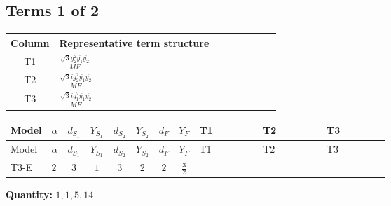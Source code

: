 \documentclass[8pt]{article}
\begin{document}
\begin{landscape}
\subsection*{Terms 1 of 2}
\begin{center}
\begin{tabular}{@{}c >{\raggedright\arraybackslash}p{0.82\linewidth}@{}}
\toprule
Column & Representative term structure \\
\midrule
T1 & \(\displaystyle \frac{\sqrt{3} g_{2}^{2} \overline{y_{1}} \overline{y_{2}}}{MF}\) \\
\midrule
T2 & \(\displaystyle \frac{\sqrt{3} i g_{2}^{2} \overline{y_{1}} \overline{y_{2}}}{MF}\) \\
\midrule
T3 & \(\displaystyle \frac{\sqrt{3} i g_{1}^{2} \overline{y_{1}} \overline{y_{2}}}{MF}\) \\
\midrule
\bottomrule
\end{tabular}
\end{center}
\smallskip
\tiny
\begin{longtable}{@{}llcccccc >{\raggedright\arraybackslash}p{0.21\linewidth} >{\raggedright\arraybackslash}p{0.21\linewidth} >{\raggedright\arraybackslash}p{0.21\linewidth}@{}}
\toprule
Model & $\alpha$ & $d_{S_1}$ & $Y_{S_1}$ & $d_{S_2}$ & $Y_{S_2}$ & $d_F$ & $Y_F$ & T1 & T2 & T3 \\
\midrule
\endfirsthead
\toprule
Model & $\alpha$ & $d_{S_1}$ & $Y_{S_1}$ & $d_{S_2}$ & $Y_{S_2}$ & $d_F$ & $Y_F$ & T1 & T2 & T3 \\
\midrule
\endhead
T3-E & $2$ & $3$ & $1$ & $3$ & $2$ & $2$ & $\frac{3}{2}$ & \scriptsize\adjustbox{max width=\linewidth}{$\begin{gathered} \frac{\sqrt{3} g_{2}^{2} \overline{y_{1}} \overline{y_{2}}}{6 MF}\end{gathered}$} & \scriptsize\adjustbox{max width=\linewidth}{$\begin{gathered} - \frac{11 \sqrt{3} i g_{2}^{2} \overline{y_{1}} \overline{y_{2}}}{8 MF}\end{gathered}$} & \scriptsize\adjustbox{max width=\linewidth}{$\begin{gathered} - \frac{9 \sqrt{3} i g_{1}^{2} \overline{y_{1}} \overline{y_{2}}}{8 MF}\end{gathered}$} \\
\midrule
\bottomrule
\end{longtable}
\clearpage
\noindent\textbf{Quantity: }$\mathrm{1,1,5,14}$\par\smallskip

\end{landscape}
\end{document}

